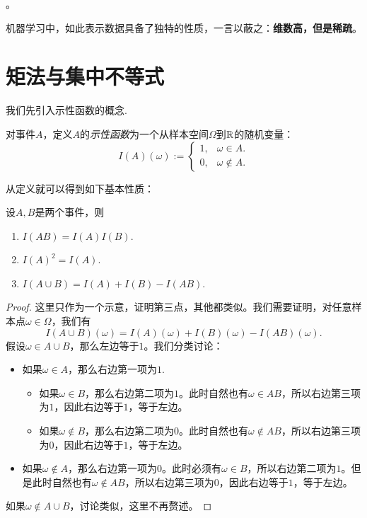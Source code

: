 \begin{remark}
    。
\end{remark}

机器学习中，如此表示数据具备了独特的性质，一言以蔽之：\textbf{维数高，但是稀疏}。


\section{矩法与集中不等式}
我们先引入示性函数的概念.
\begin{definition}[示性函数]\label{def:indicator-function}
    对事件$A$，定义$A$的\emph{示性函数}为一个从样本空间$\Omega$到$\mathbb{R}$的随机变量：
\begin{equation*}
    I(A)(\omega) := 
    \begin{cases}
        1,& \omega \in A. \\
        0,& \omega \notin A.
    \end{cases}
\end{equation*}
\end{definition}

从定义就可以得到如下基本性质：
\begin{proposition}\label{prop:indicator-function}
    设$A, B$是两个事件，则
    \begin{enumerate}
        \item $I(AB) = I(A) I(B)$.
        \item $I(A)^2 = I(A)$.
        \item $I(A\cup B) = I(A) +I(B) - I(AB) $.
    \end{enumerate}
\end{proposition}
\begin{proof}
    这里只作为一个示意，证明第三点，其他都类似。我们需要证明，对任意样本点$\omega\in\Omega$，我们有
    \[
        I(A\cup B)(\omega) = I(A)(\omega) + I(B)(\omega) - I(AB)(\omega).
    \]
    假设$\omega\in A\cup B$，那么左边等于$1$。我们分类讨论：
    \begin{itemize}
        \item 如果$\omega\in A$，那么右边第一项为$1$.
        \begin{itemize}
            \item 如果$\omega\in B$，那么右边第二项为$1$。此时自然也有$\omega\in AB$，所以右边第三项为$1$，因此右边等于$1$，等于左边。
            \item 如果$\omega\notin B$，那么右边第二项为$0$。此时自然也有$\omega\notin AB$，所以右边第三项为$0$，因此右边等于$1$，等于左边。
        \end{itemize}
        \item 如果$\omega\notin A$，那么右边第一项为$0$。此时必须有$\omega\in B$，所以右边第二项为$1$。但是此时自然也有$\omega\notin AB$，所以右边第三项为$0$，因此右边等于$1$，等于左边。
    \end{itemize}
    如果$\omega\notin A\cup B$，讨论类似，这里不再赘述。
\end{proof}

